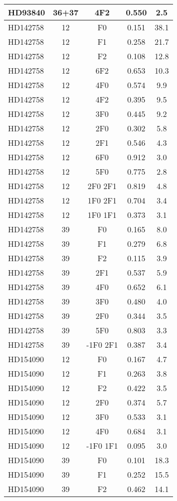 \begin{table*}
\begin{tabular}{l c c c c}
HD93840 & 36+37 & 4F2 & 0.550 & 2.5\\ 
\hline
HD142758 & 12 & F0 & 0.151 & 38.1\\ 
HD142758 & 12 & F1 & 0.258 & 21.7\\ 
HD142758 & 12 & F2 & 0.108 & 12.8\\ 
HD142758 & 12 & 6F2 & 0.653 & 10.3\\ 
HD142758 & 12 & 4F0 & 0.574 & 9.9\\ 
HD142758 & 12 & 4F2 & 0.395 & 9.5\\ 
HD142758 & 12 & 3F0 & 0.445 & 9.2\\ 
HD142758 & 12 & 2F0 & 0.302 & 5.8\\ 
HD142758 & 12 & 2F1 & 0.546 & 4.3\\ 
HD142758 & 12 & 6F0 & 0.912 & 3.0\\ 
HD142758 & 12 & 5F0 & 0.775 & 2.8\\ 
HD142758 & 12 & 2F0 2F1 & 0.819 & 4.8\\ 
HD142758 & 12 & 1F0 2F1 & 0.704 & 3.4\\ 
HD142758 & 12 & 1F0 1F1 & 0.373 & 3.1\\ 
\hline
HD142758 & 39 & F0 & 0.165 & 8.0\\ 
HD142758 & 39 & F1 & 0.279 & 6.8\\ 
HD142758 & 39 & F2 & 0.115 & 3.9\\ 
HD142758 & 39 & 2F1 & 0.537 & 5.9\\ 
HD142758 & 39 & 4F0 & 0.652 & 6.1\\ 
HD142758 & 39 & 3F0 & 0.480 & 4.0\\ 
HD142758 & 39 & 2F0 & 0.344 & 3.5\\ 
HD142758 & 39 & 5F0 & 0.803 & 3.3\\ 
HD142758 & 39 & -1F0 2F1 & 0.387 & 3.4\\ 
\hline
HD154090 & 12 & F0 & 0.167 & 4.7\\ 
HD154090 & 12 & F1 & 0.263 & 3.8\\ 
HD154090 & 12 & F2 & 0.422 & 3.5\\ 
HD154090 & 12 & 2F0 & 0.374 & 5.7\\ 
HD154090 & 12 & 3F0 & 0.533 & 3.1\\ 
HD154090 & 12 & 4F0 & 0.684 & 3.1\\ 
HD154090 & 12 & -1F0 1F1 & 0.095 & 3.0\\ 
\hline
HD154090 & 39 & F0 & 0.101 & 18.3\\ 
HD154090 & 39 & F1 & 0.252 & 15.5\\ 
HD154090 & 39 & F2 & 0.462 & 14.1\\ 

\end{tabular}
\end{table*}
